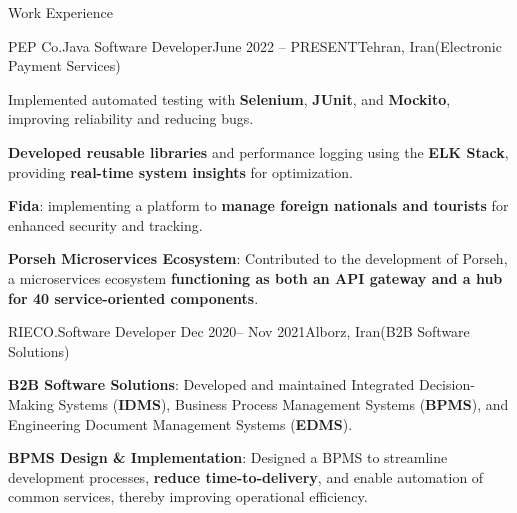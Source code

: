 \documentclass[]{kyvernitis-resume}
\begin{document}
\begin{section}{Work Experience}
\begin{subsection}{PEP Co.}{Java Software Developer}{June 2022 -- PRESENT}{Tehran, Iran}{(Electronic Payment Services)}
		\item Implemented automated testing with \textbf{Selenium}, \textbf{JUnit}, and \textbf{Mockito}, improving reliability and reducing bugs.

		\item \textbf{Developed reusable libraries} and performance logging using the \textbf{ELK Stack}, providing \textbf{real-time system insights} for optimization.

		\item \textbf{Fida}: implementing a platform to \textbf{manage foreign nationals and tourists} for enhanced security and tracking.
		\item \textbf{Porseh Microservices Ecosystem}: Contributed to the development of Porseh, a microservices ecosystem \textbf{functioning as both an API gateway and a hub for 40 service-oriented components}.
    \end{subsection}


 \begin{subsection}{RIECO.}{Software Developer }{Dec 2020-- Nov 2021}{Alborz, Iran}{(B2B Software Solutions)}
	
	\item \textbf{B2B Software Solutions}: Developed and maintained Integrated Decision-Making Systems (\textbf{IDMS}), Business Process Management Systems (\textbf{BPMS}), and Engineering Document Management Systems (\textbf{EDMS}).
	\item \textbf{BPMS Design \& Implementation}: Designed a BPMS to streamline development processes, \textbf{reduce time-to-delivery}, and enable automation of common services, thereby improving operational efficiency.
	

\end{subsection}
\end{section}
\end{document}

